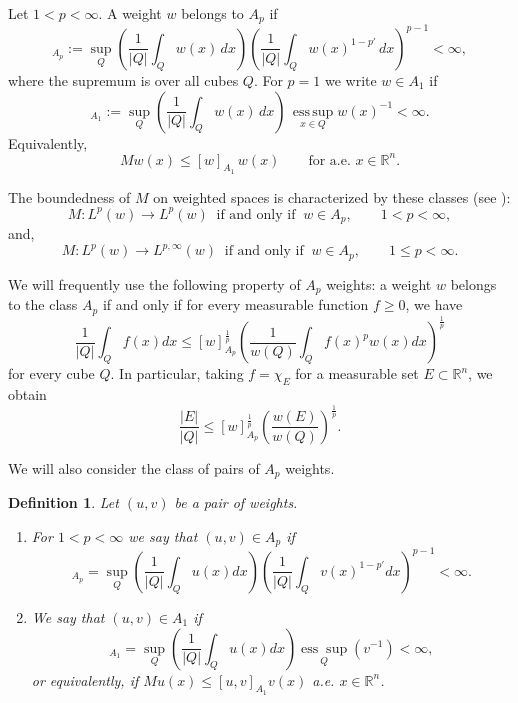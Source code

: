 \documentclass[reqno, 10pt, oneside]{amsart}
\numberwithin{equation}{section}
\newtheorem{definition}[theorem]{Definition}
\numberwithin{theorem}{section}
\newcommand{\R}{{\mathbb R}}
\newcommand{\1}{{\rm 1\hspace*{-0.4ex}%
\rule{0.1ex}{1.52ex}\hspace*{0.2ex}}}
\begin{document}
Let $1<p<\infty$. A weight $w$ belongs to $A_p$ if
\begin{equation*}
[w]_{A_p} :=\sup_Q \left(\frac{1}{|Q|}\int_Q w(x)\,dx\right)
\left(\frac{1}{|Q|}\int_Q w(x)^{1-p'}\,dx\right)^{p-1} <\infty,
\end{equation*}
where the supremum is over all cubes $Q$. For $p=1$ we write $w\in A_1$ if
\begin{equation*}
[w]_{A_1} :=\sup_Q \left(\frac{1}{|Q|}\int_Q w(x)\,dx\right)\,
\operatorname*{ess\,sup}_{x\in Q} w(x)^{-1} <\infty.
\end{equation*}
Equivalently,
\begin{equation*}
Mw(x)\le [w]_{A_1}\,w(x)\qquad\text{for a.e. }x\in\R^n.
\end{equation*}

The boundedness of $M$ on weighted spaces is characterized by these classes (see \cite{M}):
\begin{equation*}
	M:L^p(w)\longrightarrow L^p(w)\ \text{ if and only if }\ w\in A_p,\qquad 1<p<\infty,
\end{equation*}
and, 
\begin{equation*}
	M:L^p(w)\longrightarrow L^{p,\infty}(w)\ \text{ if and only if }\ w\in A_p, \qquad 1\le p<\infty.
\end{equation*}



We will frequently use the following property of $A_p$ weights: a weight $w$ belongs to the class $A_p$ if and only if  for every measurable function $f\ge 0$, we have
\begin{equation}\label{Ap 1}
	\frac{1}{|Q|}\int_Q f(x)dx \le [w]^\frac{1}{p}_{A_p} \left( \frac{1}{w(Q)}\int_Q f(x)^p w(x) dx\right)^\frac{1}{p}
\end{equation}
for every cube $Q$. In particular, taking $f=\chi_E$ for a measurable set $E\subset \R^n$, we obtain 
\begin{equation}\label{Ap 2}
	\frac{|E|}{|Q|}\le [w]^\frac{1}{p}_{A_p} \left( \frac{w(E)}{w(Q)}\right)^\frac{1}{p}.
\end{equation}


We will also consider the class of pairs of $A_p$ weights.

\begin{definition}\label{def:pair}
	Let $(u,v)$ be a pair of weights.
	\begin{enumerate}
		\item For $1<p<\infty$ we say that $(u,v)\in A_p$ if
			\begin{equation*}
				[u,v]_{A_p}= \sup_Q \left( \frac{1}{|Q|}\int_Q u(x)dx\right)\left( \frac{1}{|Q|}\int_Q v(x)^{1-p'} dx\right) ^{p-1} <\infty.
			\end{equation*}
		\item We say that $(u,v)\in A_1$ if
			\begin{equation*}
				[u,v]_{A_1}= \sup_Q \left( \frac{1}{|Q|}\int_Q u(x)dx\right) \underset{ Q}{\operatorname{ess} \sup} \left(v^{-1}\right)	<\infty,
			\end{equation*}
			or equivalently, if $Mu(x)\le [u,v]_{A_1} v(x)$ a.e. $x\in \R^n$.
	\end{enumerate}
\end{definition}
\end{document}
